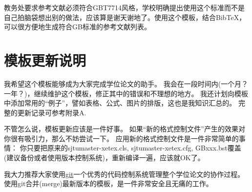 教务处要求参考文献必须符合GBT7714风格，学校明确提出使用这个标准而不是自己拍脑袋想出别的做法，应该算是谢天谢地了。使用这个模板，结合BibTeX，可以很方便地生成符合GB标准的参考文献列表。

\section{模板更新说明}
\label{sec:update}

我希望这个模板能够成为大家完成学位论文的助手。
我会在一段时间内(一个月？一年？)，继续维护这个模板，修正其中的错误和不理想的地方。
我还计划向模板中添加常用的``例子''，譬如表格、公式、图片的排版，这也是我知识汇总的。
完整的更新记录可参考附录A.

不管怎么说，模板更新应该是一件好事。
如果``新的格式控制文件''产生的效果对你很有吸引力，那么不妨尝试一下。
应用新的格式控制文件是一件非常简单的事情：
你只要把原来的sjtumaster-xetex.cls, sjtumaster-xetex.cfg, GBxxx.bst覆盖(建议备份或者使用版本控制系统)，重新编译一遍，应该就OK了。

我大力推荐大家使用\href{http://git-scm.com}{git}\cndash{}一个优秀的代码控制系统\cndash{}管理整个学位论文的协作过程。使用git合并(merge)最新版本的模板，是一件非常安全且无痛的工作。


